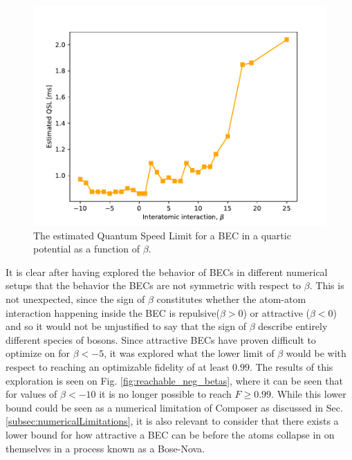 \documentclass[a4paper, twocolumn]{revtex4-1}
\begin{document}
\begin{figure}[h]
	\includegraphics[width=\columnwidth]{graphics/exploration/QSL.pdf}
	\caption{The estimated Quantum Speed Limit for a BEC in a quartic potential as a function of $\beta$.}
	\label{fig:QSL}
\end{figure}

It is clear after having explored the behavior of BECs in different numerical setups that the behavior the BECs are not symmetric with respect to $\beta$. This is not unexpected, since the sign of $\beta$ constitutes whether the atom-atom interaction happening inside the BEC is repulsive($\beta>0$) or attractive ($\beta<0$) and so it would not be unjustified to say that the sign of $\beta$ describe entirely different species of bosons. Since attractive BECs have proven difficult to optimize on for $\beta<-5$, it was explored what the lower limit of $\beta$ would be with respect to reaching an optimizable fidelity of at least $0.99$. The results of this exploration is seen on Fig. \ref{fig:reachable_neg_betas}, where it can be seen that for values of $\beta<-10$ it is no longer possible to reach $F\geq0.99$. While this lower bound could be seen as a numerical limitation of Composer as discussed in Sec. \ref{subsec:numericalLimitations}, it is also relevant to consider that there exists a lower bound for how attractive a BEC can be before the atoms collapse in on themselves in a process known as a Bose-Nova\cite{Donley2001}.
\end{document}
